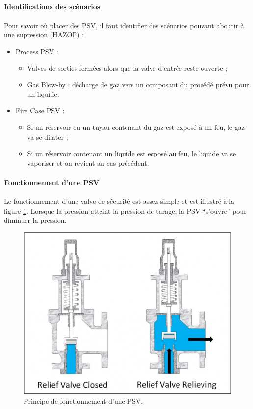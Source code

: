 \paragraph{Identifications des scénarios}
Pour savoir où placer des PSV, il faut identifier des scénarios
pouvant aboutir à une supression (HAZOP) :
\begin{itemize}
	\item Process PSV :
		\begin{itemize}
			\item Valves de sorties fermées alors que la valve
			d'entrée reste ouverte ;
			\item Gas Blow-by : décharge de gaz vers un composant
			du procédé prévu pour un liquide.
		\end{itemize}
	\item Fire Case PSV :
		\begin{itemize}
			\item	Si un réservoir ou un tuyau contenant du gaz
			est exposé à un feu, le gaz va se dilater ;
			\item Si un réservoir contenant un liquide est esposé
			au feu, le liquide va se vaporiser et on revient au
			cas précédent.
		\end{itemize}
\end{itemize}

\paragraph{Fonctionnement d'une PSV}
Le fonctionnement d'une valve de sécurité est assez
simple et est illustré à la figure \ref{fig:safety-valve}.
Lorsque la pression atteint la pression de tarage,
la PSV ``s'ouvre'' pour diminuer la pression.

\begin{figure}[ht]
	\centering
	\includegraphics[scale=0.2]{media/safety-valve.jpg}
	\caption{Principe de fonctionnement d'une PSV.}
	\label{fig:safety-valve}
\end{figure}

